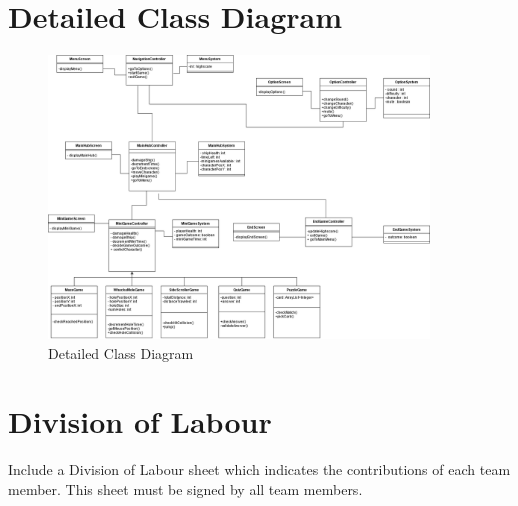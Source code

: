 \documentclass[]{article}
\begin{document}

\section{Detailed Class Diagram}
\label{sec:detailed_class_diagram}
\begin{figure}[H]
    \centering
    \includegraphics[width=0.9\textwidth]{D3/designdiagram/detailedclassdiagrams.png}
    \caption{Detailed Class Diagram}
    \label{fig:dcd}
\end{figure}


\newpage
\appendix
\section{Division of Labour}
\label{sec:division_of_labour}
Include a Division of Labour sheet which indicates the contributions of each team member. This sheet must be signed by all team members.
\end{document}
